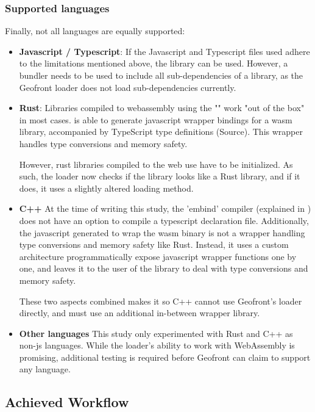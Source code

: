 \subsubsection*{Supported languages}
Finally, not all languages are equally supported:

\begin{itemize}[-]
  \item \textbf{Javascript / Typescript}: 
    If the Javascript and Typescript files used adhere to the limitations mentioned above, the library can be used. 
    However, a bundler needs to be used to include all sub-dependencies of a library, as the Geofront loader does not load sub-dependencies currently. 

  \item \textbf{Rust}:
    Libraries compiled to webassembly using the "" work "out of the box" in most cases.
     is able to generate javascript wrapper bindings for a \ac{wasm} library, accompanied by TypeScript type definitions (Source). 
    This wrapper handles type conversions and memory safety. 
    
    However, rust libraries compiled to the web use have to be initialized. 
    As such, the loader now checks if the library looks like a Rust library, and if it does, it uses a slightly altered loading method.
  \item \textbf{C++}
    At the time of writing this study, the 'embind' compiler (explained in ) does not have an option to compile a typescript declaration file. 
    Additionally, the javascript generated to wrap the wasm binary is not a wrapper handling type conversions and memory safety like Rust. 
    Instead, it uses a custom architecture programmatically expose javascript wrapper functions one by one, and leaves it to the user of the library to deal with type conversions and memory safety. 
    
    These two aspects combined makes it so C++ cannot use Geofront's loader directly, and must use an additional in-between wrapper library.

  \item \textbf{Other languages}
    This study only experimented with Rust and C++ as non-js languages.
    While the loader's ability to work with WebAssembly is promising, additional testing is required before Geofront can claim to support any language. 
\end{itemize}


\subsection{Achieved Workflow}

